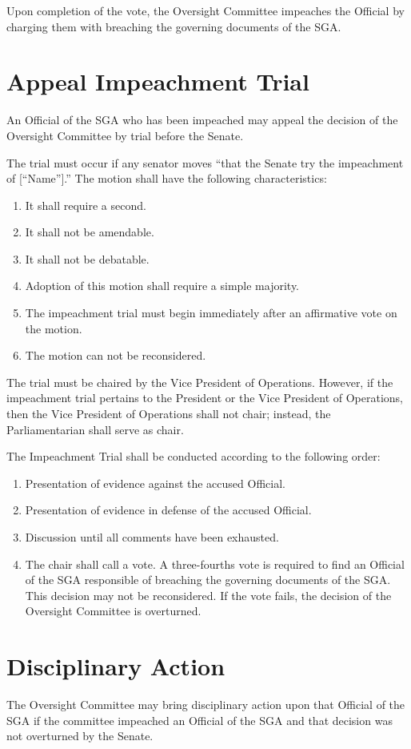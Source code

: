 \documentclass[12pt]{scrreprt}
\begin{document}
Upon completion of the vote, the Oversight Committee impeaches the Official by charging them with
breaching the governing documents of the SGA.


\section{Appeal Impeachment Trial}
An Official of the SGA who has been impeached may appeal the decision of the Oversight Committee by
trial before the Senate.

The trial must occur if any senator moves “that the Senate try the impeachment of [“Name”].” The motion
shall have the following characteristics:
\begin{enumerate}
    \item It shall require a second.
    \item It shall not be amendable.
    \item It shall not be debatable.
    \item Adoption of this motion shall require a simple majority.
    \item The impeachment trial must begin immediately after an affirmative vote on the motion.
    \item The motion can not be reconsidered.
\end{enumerate}

The trial must be chaired by the Vice President of Operations. However, if the impeachment trial pertains
to the President or the Vice President of Operations, then the Vice President of Operations shall not chair;
instead, the Parliamentarian shall serve as chair.

The Impeachment Trial shall be conducted according to the following order:
\begin{enumerate}
    \item Presentation of evidence against the accused Official.
    \item Presentation of evidence in defense of the accused Official.
    \item Discussion until all comments have been exhausted.
    \item The chair shall call a vote. A three-fourths vote is required to find an Official of the SGA
responsible of breaching the governing documents of the SGA. This decision may not be
reconsidered. If the vote fails, the decision of the Oversight Committee is overturned.
\end{enumerate}

\section{Disciplinary Action} \label{sec:disciplinary_action}
 The Oversight Committee may bring disciplinary action upon that Official of the SGA if the committee
impeached an Official of the SGA and that decision was not overturned by the Senate.
\end{document}
